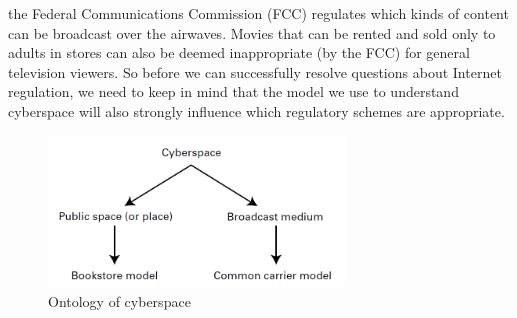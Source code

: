 \documentclass[12pt]{article}
\theoremstyle{definition}
\begin{document}
the Federal Communications Commission (FCC) regulates which kinds of content can be
broadcast over the airwaves. Movies that can be rented and sold only to adults in stores
can also be deemed inappropriate (by the FCC) for general television viewers. So before
we can successfully resolve questions about Internet regulation, we need to keep in mind
that the model we use to understand cyberspace will also strongly influence which
regulatory schemes are appropriate.\\
\begin{figure}[h]
\centering
\includegraphics[width=0.7\textwidth]{10.png}
\caption{Ontology of cyberspace}
\end{figure}
\end{document}
